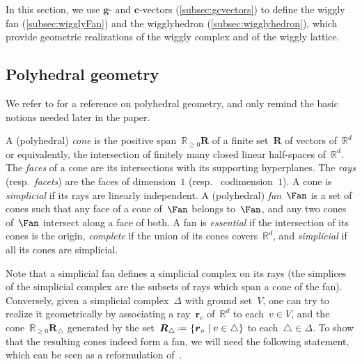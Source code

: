 \documentclass{amsart}
\theoremstyle{definition}
\newcommand{\R}{\mathbb{R}} %
\renewcommand{\b}[1]{{\boldsymbol{#1}}} %
\newcommand{\set}[2]{\left\{ #1 \;\middle|\; #2 \right\}} %
\newcommand{\eqdef}{\mbox{\,\raisebox{0.2ex}{\scriptsize\ensuremath{\mathrm:}}\ensuremath{=}\,}} %
\newcommand{\darkblue}{\color{darkblue}} %
\newcommand{\defn}[1]{\textsl{\darkblue #1}} %
\begin{document}
In this section, we use $\b{g}$- and $\b{c}$-vectors (\cref{subsec:gcvectors}) to define the wiggly fan (\cref{subsec:wigglyFan}) and the wigglyhedron (\cref{subsec:wigglyhedron}), which provide geometric realizations of the wiggly complex and of the wiggly lattice.


\subsection{Polyhedral geometry}
\label{subsec:polyhedralGeometry}

We refer to \cite{Ziegler-polytopes} for a reference on polyhedral geometry, and only remind the basic notions needed later in the paper.

A (polyhedral) \defn{cone} is the positive span~$\R_{\ge 0}\b{R}$ of a finite set~$\b{R}$ of vectors of~$\R^d$ or equivalently, the intersection of finitely many closed linear half-spaces of~$\R^d.$ 
The \defn{faces} of a cone are its intersections with its supporting hyperplanes. 
The \defn{rays} (resp.~\defn{facets}) are the faces of dimension~$1$ (resp.~ codimension~$1$).
A cone is \defn{simplicial} if its rays are linearly independent.
A (polyhedral) \defn{fan}~$\Fan$ is a set of cones such that any face of a cone of~$\Fan$ belongs to~$\Fan$, and any two cones of~$\Fan$ intersect along a face of both. 
A fan is \defn{essential} if the intersection of its cones is the origin, \defn{complete} if the union of its cones covers~$\R^d$, and \defn{simplicial} if all its cones are simplicial.

Note that a simplicial fan defines a simplicial complex on its rays (the simplices of the simplicial complex are the subsets of rays which span a cone of the fan).
Conversely, given a simplicial complex~$\Delta$ with ground set~$V$, one can try to realize it geometrically by associating a ray~$\b{r}_v$ of~$\R^d$ to each~$v \in V$, and the cone~$\R_{\ge 0}\b{R}_\triangle$ generated by the set~$\b{R}_\triangle \eqdef \set{\b{r}_v}{v \in \triangle}$ to each~$\triangle \in \Delta$.
To show that the resulting cones indeed form a fan, we will need the following statement, which can be seen as a reformulation of~\cite[Coro.~4.5.20]{DeLoeraRambauSantos}.
\end{document}
